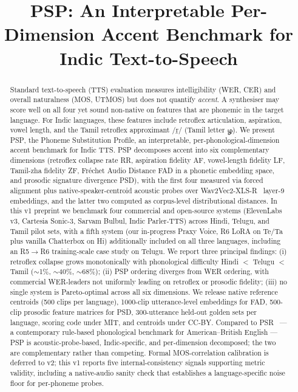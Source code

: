 \documentclass[conference,a4paper]{IEEEtran}
\newcommand{\psp}{\textsc{PSP}}
\begin{document}
\title{\psp: An Interpretable Per-Dimension Accent Benchmark for Indic Text-to-Speech}

\author{
}

\maketitle

\begin{abstract}
Standard text-to-speech (TTS) evaluation measures intelligibility (WER, CER) and overall naturalness (MOS, UTMOS) but does not quantify \emph{accent}. A synthesiser may score well on all four yet sound non-native on features that are phonemic in the target language. For Indic languages, these features include retroflex articulation, aspiration, vowel length, and the Tamil retroflex approximant /\b{r}/ (Tamil letter ழ). We present \psp, the Phoneme Substitution Profile, an interpretable, per-phonological-dimension accent benchmark for Indic TTS. \psp{} decomposes accent into six complementary dimensions (retroflex collapse rate RR, aspiration fidelity AF, vowel-length fidelity LF, Tamil-zha fidelity ZF, Fr\'echet Audio Distance FAD in a phonetic embedding space, and prosodic signature divergence PSD), with the first four measured via forced alignment plus native-speaker-centroid acoustic probes over Wav2Vec2-XLS-R~\cite{babu2021xlsr} layer-9 embeddings, and the latter two computed as corpus-level distributional distances. In this v1 preprint we benchmark four commercial and open-source systems (ElevenLabs v3, Cartesia Sonic-3, Sarvam Bulbul, Indic Parler-TTS) across Hindi, Telugu, and Tamil pilot sets, with a fifth system (our in-progress Praxy Voice, R6 LoRA on Te/Ta plus vanilla Chatterbox on Hi) additionally included on all three languages, including an R5$\to$R6 training-scale case study on Telugu. We report three principal findings: (i) retroflex collapse grows monotonically with phonological difficulty Hindi $<$ Telugu $<$ Tamil ($\sim$1\%, $\sim$40\%, $\sim$68\%); (ii) \psp{} ordering diverges from WER ordering, with commercial WER-leaders not uniformly leading on retroflex or prosodic fidelity; (iii) no single system is Pareto-optimal across all six dimensions. We release native reference centroids (500 clips per language), 1000-clip utterance-level embeddings for FAD, 500-clip prosodic feature matrices for PSD, 300-utterance held-out golden sets per language, scoring code under MIT, and centroids under CC-BY. Compared to PSR~\cite{psr2026} --- a contemporary rule-based phonological benchmark for American--British English --- \psp{} is acoustic-probe-based, Indic-specific, and per-dimension decomposed; the two are complementary rather than competing. Formal MOS-correlation calibration is deferred to v2; this v1 reports five internal-consistency signals supporting metric validity, including a native-audio sanity check that establishes a language-specific noise floor for per-phoneme probes.
\end{abstract}
\end{document}
